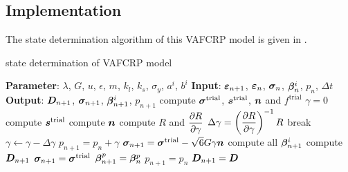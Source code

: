 \subsection{Implementation}
The state determination algorithm of this VAFCRP model is given in .
\begin{breakablealgorithm}
\caption{state determination of VAFCRP model}\label{algo:vafcrp_model}
\begin{algorithmic}
\State \textbf{Parameter}: $\lambda$, $G$, $u$, $\epsilon$, $m$, $k_l$, $k_s$, $\sigma_y$, $a^i$, $b^i$
\State \textbf{Input}: $\bm{\varepsilon}_{n+1}$, $\bm{\varepsilon}_n$, $\bm{\sigma}_n$, $\bm{\beta}_n^i$, $p_n$, $\Delta{}t$
\State \textbf{Output}: $\bm{D}_{n+1}$, $\bm{\sigma}_{n+1}$, $\bm{\beta}_{n+1}^i$, $p_{n+1}$
\State compute $\bm{\sigma}^\text{trial}$, $\bm{s}^\text{trial}$, $\bm{n}$ and $f^\text{trial}$
\State $\gamma=0$
\State compute $\bm{s}^\text{trial}$
\State compute $\bm{n}$
\State compute $R$ and $\dfrac{\partial{R}}{\partial{\gamma}}$
\State $\Delta\gamma=\left(\dfrac{\partial{R}}{\partial{\gamma}}\right)^{-1}R$
\State break
\EndIf
\State $\gamma\leftarrow\gamma-\Delta\gamma$
\State $p_{n+1}=p_n+\gamma$
\EndWhile
\State $\bm{\sigma}_{n+1}=\bm{\sigma}^\text{trial}-\sqrt{6}G\gamma\bm{n}$
\State compute all $\bm{\beta}_{n+1}^i$
\State compute $\bm{D}_{n+1}$
\Else
\State $\bm{\sigma}_{n+1}=\bm{\sigma}^\text{trial}$
\State $\bm{\beta}^p_{n+1}=\bm{\beta}^p_n$
\State $p_{n+1}=p_n$
\State $\bm{D}_{n+1}=\bm{D}$
\EndIf
\end{algorithmic}
\end{breakablealgorithm}
